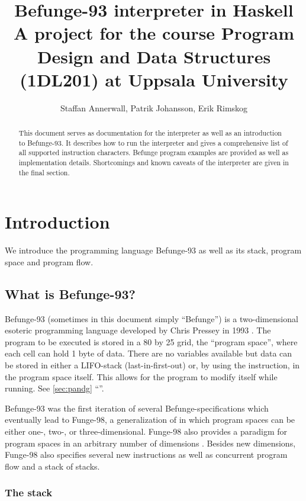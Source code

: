 \documentclass[12pt, a4paper]{article}
\title{Befunge-93 interpreter in Haskell\\
\vspace{5pt}
\small{A project for the course Program Design and Data Structures (1DL201) at Uppsala University}}
\author{Staffan Annerwall, Patrik Johansson, Erik Rimskog}
\begin{document}
\maketitle

\begin{abstract}
This document serves as documentation for the interpreter as well as an introduction to Befunge-93. It describes how to run the interpreter and gives a comprehensive list of all supported instruction characters. Befunge program examples are provided as well as implementation details. Shortcomings and known caveats of the interpreter are given in the final section.
\end{abstract}

\newpage

\tableofcontents

\newpage

\section{Introduction}
We introduce the programming language Befunge-93 as well as its stack, program space and program flow.
\label{sec:intro}

\subsection{What is Befunge-93?}
\label{sec:whatis}

Befunge-93 (sometimes in this document simply “Befunge”) is a two-dimensional esoteric programming language developed by Chris Pressey in 1993 \cite{esolangs}. The program to be executed is stored in a 80 by 25 grid, the “program space”, where each cell can hold 1 byte of data. There are no variables available but data can be stored in either a LIFO-stack (last-in-first-out) or, by using the  instruction, in the program space itself. This allows for the program to modify itself while running. See \ref{sec:pandg} “”.

Befunge-93 was the first iteration of several Befunge-specifications which eventually lead to Funge-98, a generalization of in which program spaces can be either one-, two-, or three-dimensional. Funge-98 also provides a paradigm for program spaces in an arbitrary number of dimensions \cite{funge98}. Besides new dimensions, Funge-98 also specifies several new instructions as well as concurrent program flow and a stack of stacks.

\subsubsection{The stack}
\label{sec:stack}
\end{document}
